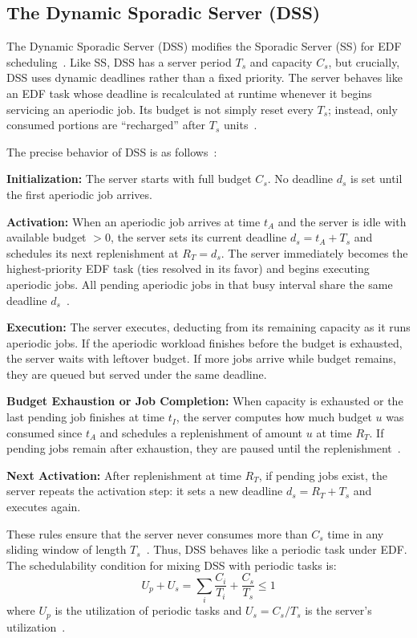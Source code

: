 \documentclass[conference]{IEEEtran}
\begin{document}
\subsection{The Dynamic Sporadic Server (DSS)}
The Dynamic Sporadic Server (DSS) modifies the Sporadic Server (SS) for EDF scheduling~\cite{spuri1994efficient}. 
Like SS, DSS has a server period $T_s$ and capacity $C_s$, but crucially, DSS uses dynamic deadlines rather than a fixed priority. 
The server behaves like an EDF task whose deadline is recalculated at runtime whenever it begins servicing an aperiodic job. 
Its budget is not simply reset every $T_s$; instead, only consumed portions are ``recharged'' after $T_s$ units~\cite{spuri1994efficient,buttazzo2011hard}.

The precise behavior of DSS is as follows~\cite{spuri1994efficient,buttazzo2011hard}:

\textbf{Initialization:} The server starts with full budget $C_s$. No deadline $d_s$ is set until the first aperiodic job arrives.

\textbf{Activation:} When an aperiodic job arrives at time $t_A$ and the server is idle with available budget $>0$, the server sets its current deadline $d_s = t_A + T_s$ and schedules its next replenishment at $R_T = d_s$. 
The server immediately becomes the highest-priority EDF task (ties resolved in its favor) and begins executing aperiodic jobs. 
All pending aperiodic jobs in that busy interval share the same deadline $d_s$~\cite{spuri1994efficient}.

\textbf{Execution:} The server executes, deducting from its remaining capacity as it runs aperiodic jobs. 
If the aperiodic workload finishes before the budget is exhausted, the server waits with leftover budget. 
If more jobs arrive while budget remains, they are queued but served under the same deadline.


\textbf{Budget Exhaustion or Job Completion:} When capacity is exhausted or the last pending job finishes at time $t_I$, the server computes how much budget $u$ was consumed since $t_A$ and schedules a replenishment of amount $u$ at time $R_T$. 
If pending jobs remain after exhaustion, they are paused until the replenishment~\cite{spuri1994efficient}.

\textbf{Next Activation:} After replenishment at time $R_T$, if pending jobs exist, the server repeats the activation step: it sets a new deadline $d_s = R_T + T_s$ and executes again.

These rules ensure that the server never consumes more than $C_s$ time in any sliding window of length $T_s$~\cite{spuri1994efficient,buttazzo2011hard}. 
Thus, DSS behaves like a periodic task under EDF. The schedulability condition for mixing DSS with periodic tasks is:
\[
U_p + U_s = \sum_i \frac{C_i}{T_i} + \frac{C_s}{T_s} \leq 1
\]
where $U_p$ is the utilization of periodic tasks and $U_s = C_s/T_s$ is the server's utilization~\cite{buttazzo2011hard}.
\end{document}
